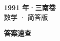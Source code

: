 \documentclass[zihao=-4, a4paper]{ctexart}
\begin{document}
\begin{center}
  {\Large\bfseries 1991 年·三南卷}\\[4pt]
  {\large 数学 · 简答版}
\end{center}
\medskip
{}

\clearpage
{}
\begin{center}{\Large\bfseries 答案速查}\end{center}
\medskip

\end{document}
